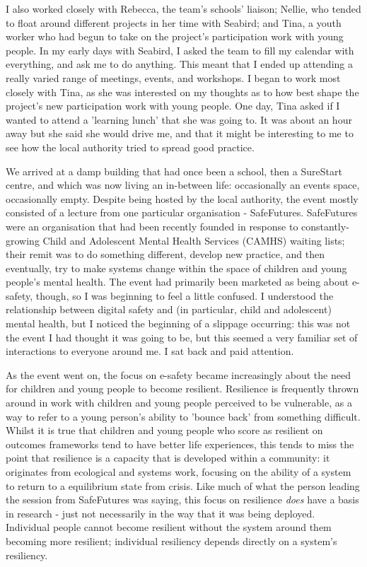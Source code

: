 I also worked closely with Rebecca, the team's schools' liaison; Nellie, who tended to float around different projects in her time with Seabird; and Tina, a youth worker who had begun to take on the project's participation work with young people. In my early days with Seabird, I asked the team to fill my calendar with everything, and ask me to do anything. This meant that I ended up attending a really varied range of meetings, events, and workshops. I began to work most closely with Tina, as she was interested on my thoughts as to how best shape the project's new participation work with young people. One day, Tina asked if I wanted to attend a 'learning lunch' that she was going to. It was about an hour away but she said she would drive me, and that it might be interesting to me to see how the local authority tried to spread good practice.  

We arrived at a damp building that had once been a school, then a SureStart centre, and which was now living an in-between life: occasionally an events space, occasionally empty. Despite being hosted by the local authority, the event mostly consisted of a lecture from one particular organisation - SafeFutures. SafeFutures were an organisation that had been recently founded in response to constantly-growing Child and Adolescent Mental Health Services (CAMHS) waiting lists; their remit was to do something different, develop new practice, and then eventually, try to make systems change within the space of children and young people's mental health. The event had primarily been marketed as being about e-safety, though, so I was beginning to feel a little confused. I understood the relationship between digital safety and (in particular, child and adolescent) mental health, but I noticed the beginning of a slippage occurring: this was not the event I had thought it was going to be, but this seemed a very familiar set of interactions to everyone around me. I sat back and paid attention. 

As the event went on, the focus on e-safety became increasingly about the need for children and young people to become resilient. Resilience is frequently thrown around in work with children and young people perceived to be vulnerable, as a way to refer to a young person's ability to 'bounce back' from something difficult. Whilst it is true that children and young people who score as resilient on outcomes frameworks tend to have better life experiences, this tends to miss the point that resilience is a capacity that is developed within a community: it originates from ecological and systems work, focusing on the ability of a system to return to a equilibrium state from crisis. Like much of what the person leading the session from SafeFutures was saying, this focus on resilience \textit{does} have a basis in research - just not necessarily in the way that it was being deployed. Individual people cannot become resilient without the system around them becoming more resilient; individual resiliency depends directly on a system's resiliency. 

